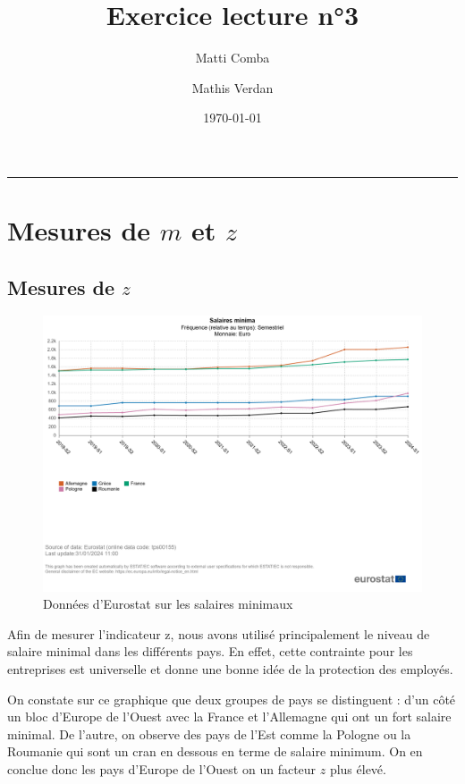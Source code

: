 \documentclass{article}
\title{\Huge \textbf{Exercice lecture n°3}}
\author{Matti Comba \and Mathis Verdan}
\date{\today}
\begin{document}
\maketitle
\begin{center}
  \rule{\linewidth}{0.5mm}
\end{center}


\section{Mesures de $m$ et $z$}

\subsection{Mesures de $z$}

\begin{figure}[H]
  \centering
  \begin{minipage}{0.8\textwidth}
      \centering
      \includegraphics[width=\textwidth]{"smic.png"}
      \caption{Données d'Eurostat sur les salaires minimaux}
  \end{minipage}
\end{figure}
\vspace{0.5cm}

Afin de mesurer l'indicateur z, nous avons utilisé principalement le niveau de salaire minimal dans les différents pays. En effet, cette contrainte pour les entreprises est universelle et donne une bonne idée de la protection des employés.

On constate sur ce graphique que deux groupes de pays se distinguent : d'un côté un bloc d'Europe de l'Ouest avec la France et l'Allemagne qui ont un fort salaire minimal. De l'autre, on observe des pays de l'Est comme la Pologne ou la Roumanie qui sont un cran en dessous en terme de salaire minimum. On en conclue donc les pays d'Europe de l'Ouest on un facteur $z$ plus élevé.
\end{document}
